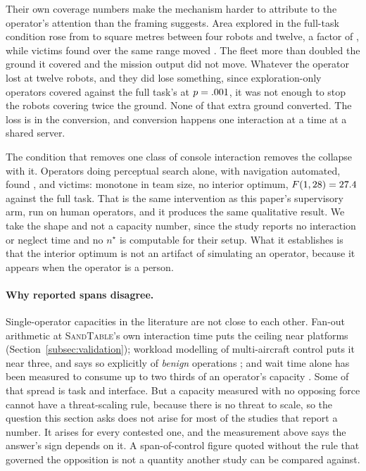 \documentclass[11pt]{article}
\newcommand{\sandtable}{\textsc{SandTable}}
\begin{document}
Their own coverage numbers make the mechanism harder to attribute to the operator's attention than the framing suggests. Area explored in the full-task condition rose from \lwAreaFullFour{} to \lwAreaFullTwelve{} square metres between four robots and twelve, a factor of \lwAreaRatio{}, while victims found over the same range moved \lwYieldDelta{}. The fleet more than doubled the ground it covered and the mission output did not move. Whatever the operator lost at twelve robots, and they did lose something, since exploration-only operators covered \lwAreaExplTwelve{} against the full task's \lwAreaFullTwelve{} at $p = .001{}$, it was not enough to stop the robots covering twice the ground. None of that extra ground converted. The loss is in the conversion, and conversion happens one interaction at a time at a shared server.

The condition that removes one class of console interaction removes the collapse with it. Operators doing perceptual search alone, with navigation automated, found \lwPercFour{}, \lwPercEight{} and \lwPercTwelve{} victims: monotone in team size, no interior optimum, $F(1, 28) = 27.4$ against the full task. That is the same intervention as this paper's supervisory arm, run on human operators, and it produces the same qualitative result. We take the shape and not a capacity number, since the study reports no interaction or neglect time and no $n^\star$ is computable for their setup. What it establishes is that the interior optimum is not an artifact of simulating an operator, because it appears when the operator is a person.

\paragraph{Why reported spans disagree.} Single-operator capacities in the literature are not close to each other. Fan-out arithmetic at \sandtable{}'s own interaction time puts the ceiling near \provMagicFanout{} platforms (Section~\ref{subsec:validation}); workload modelling of multi-aircraft control puts it near three, and says so explicitly of \emph{benign} operations \citep{schneider2011workload}; and wait time alone has been measured to consume up to two thirds of an operator's capacity \citep{cummings2008predicting}. Some of that spread is task and interface. But a capacity measured with no opposing force cannot have a threat-scaling rule, because there is no threat to scale, so the question this section asks does not arise for most of the studies that report a number. It arises for every contested one, and the measurement above says the answer's sign depends on it. A span-of-control figure quoted without the rule that governed the opposition is not a quantity another study can be compared against.
\end{document}
